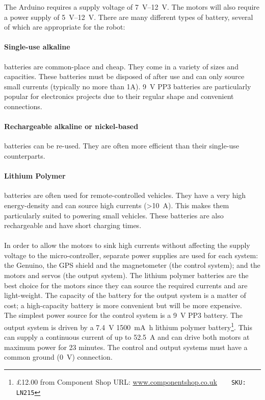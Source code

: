         \label{outline: power}
            The \gls{Arduino} requires a supply voltage of \SIrange{7}{12}{\volt}. The motors will also require a power supply of \SIrange{5}{12}{\volt}. There are many different types of battery, several of which are appropriate for the robot:

            \paragraph{Single-use alkaline} batteries are common-place and cheap. They come in a variety of sizes and capacities. These batteries must be disposed of after use and can only source small currents (typically no more than 1A). \SI{9}{\volt} PP3 batteries are particularly popular for electronics projects due to their regular shape and convenient connections.
            \paragraph{Rechargeable alkaline or nickel-based} batteries can be re-used. They are often more efficient than their single-use counterparts.
            \paragraph{Lithium Polymer} batteries are often used for remote-controlled vehicles. They have a very high energy-density and can source high currents (>\SI{10}{\ampere}). This makes them particularly suited to powering small vehicles. These batteries are also rechargeable and have short charging times.

            \paragraph{}In order to allow the motors to sink high currents without affecting the supply voltage to the micro-controller, separate power supplies are used for each system: the \gls{Genuino}, the GPS shield and the \gls{magnetometer} (the control system); and the motors and \glspl{servo} (the output system). The lithium polymer batteries are the best choice for the motors since they can source the required currents and are light-weight. The capacity of the battery for the output system is a matter of cost; a high-capacity battery is more convenient but will be more expensive.\\
            The simplest power source for the control system is a \SI{9}{\volt} PP3 battery. The output system is driven by a \SI{7.4}{\volt} \SI{1500}{\milli\ampere\hour} lithium polymer battery\footnote{\pounds{12.00} from Component Shop \textsc{URL:} \url{www.componentshop.co.uk}~~~~\texttt{SKU: LN215}}. This can supply a continuous current of up to \SI{52.5}{\ampere} and can drive both motors at maximum power for 23 minutes. The control and output systems must have a common ground (\SI{0}{\volt}) connection.


